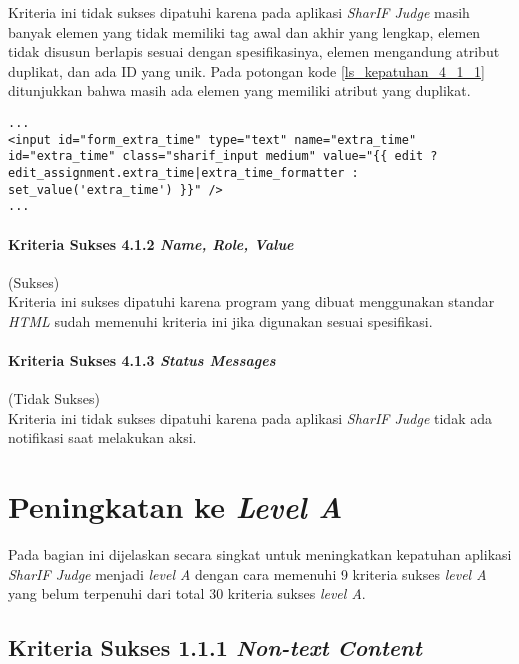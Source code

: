Kriteria ini tidak sukses dipatuhi karena pada aplikasi \textit{SharIF Judge} masih banyak elemen yang tidak memiliki tag awal dan akhir yang lengkap, elemen tidak disusun berlapis sesuai dengan spesifikasinya, elemen mengandung atribut duplikat, dan ada ID yang unik. Pada potongan kode \ref{ls_kepatuhan_4_1_1} ditunjukkan bahwa masih ada elemen yang memiliki atribut yang duplikat.
\begin{lstlisting}[basicstyle=\ttfamily, frame=single,
columns=fullflexible, keepspaces=true, breaklines=true, label=ls_kepatuhan_4_1_1, caption=Pelanggaran Kriteria Sukses 4.1.1 - Elemen Memiliki Atribut Duplikat]
...
<input id="form_extra_time" type="text" name="extra_time" id="extra_time" class="sharif_input medium" value="{{ edit ? edit_assignment.extra_time|extra_time_formatter : set_value('extra_time') }}" />
...
\end{lstlisting}

\paragraph{Kriteria Sukses 4.1.2 \textit{Name, Role, Value}}
\label{subsubsec:kepatuhan_kriteria_4.1.2}
(Sukses) \\

Kriteria ini sukses dipatuhi karena program yang dibuat menggunakan standar \textit{HTML} sudah memenuhi kriteria ini jika digunakan sesuai spesifikasi.

\paragraph{Kriteria Sukses 4.1.3 \textit{Status Messages}}
\label{subsubsec:kepatuhan_kriteria_4.1.3}
(Tidak Sukses) \\

Kriteria ini tidak sukses dipatuhi karena pada aplikasi \textit{SharIF Judge} tidak ada notifikasi saat melakukan aksi.

\section{Peningkatan ke \textit{Level A}}
\label{sec:peningkatan_level_A}

Pada bagian ini dijelaskan secara singkat untuk meningkatkan kepatuhan aplikasi \textit{SharIF Judge} menjadi \textit{level A} dengan cara memenuhi 9 kriteria sukses \textit{level A} yang belum terpenuhi dari total 30 kriteria sukses \textit{level A}.

\subsection{Kriteria Sukses 1.1.1 \textit{Non-text Content}}
\label{subsec:peningkatan_A_1.1.1}

